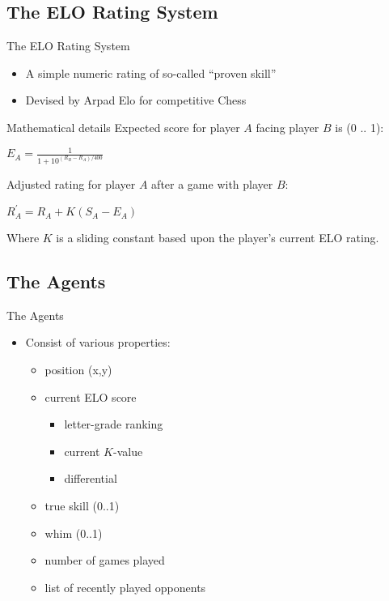 \documentclass[12pt]{beamer}
\begin{document}
\subsection{The ELO Rating System}
\begin{frame}{The ELO Rating System}
  \begin{itemize}
    \item A simple numeric rating of so-called ``proven skill''
    \item Devised by Arpad Elo for competitive Chess
  \end{itemize}
  \begin{block}{Mathematical details}
    Expected score for player $A$ facing player $B$ is (0 .. 1):
    \begin{center}
    $E_A = \frac 1 {1 + 10^{(R_B - R_A)/400}}$
    \end{center}
    Adjusted rating for player $A$ after a game with player $B$:
    \begin{center}
    $R_A^\prime = R_A + K(S_A - E_A)$
    \end{center}
    Where $K$ is a sliding constant based upon the player's current ELO rating.
  \end{block}
\end{frame}

\subsection{The Agents}
\begin{frame}{The Agents}
  \begin{itemize}
    \item Consist of various properties:
    \begin{itemize}
      \item position (x,y)
      \item current ELO score
      \begin{itemize}
        \item letter-grade ranking
        \item current $K$-value
        \item differential
      \end{itemize}
      \item true skill (0..1)
      \item whim (0..1)
      \item number of games played
      \item list of recently played opponents
    \end{itemize}
  \end{itemize}
\end{frame}
\end{document}
